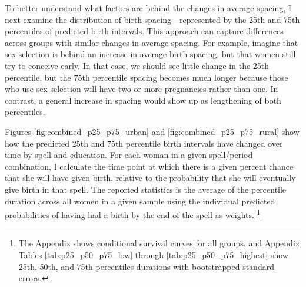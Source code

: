 \documentclass[12pt,letterpaper]{article}
\begin{document}
To better understand what factors are behind the changes in average spacing, I next 
examine the distribution of birth spacing---represented by the 25th and 75th percentiles 
of predicted birth intervals. 
This approach can capture differences across groups with similar changes in average spacing. 
For example, imagine that sex selection is behind an increase in average birth spacing, 
but that women still try to conceive early. 
In that case, we should see little change in the 25th percentile, but the 75th percentile 
spacing becomes much longer because those who use sex selection will have two or more 
pregnancies rather than one. 
In contrast, a general increase in spacing would show up as lengthening of both percentiles.

Figures \ref{fig:combined_p25_p75_urban} and \ref{fig:combined_p25_p75_rural} 
show how the predicted 25th and 75th percentile birth intervals have changed over time 
by spell and education.
For each woman in a given spell/period combination, I calculate the time point at 
which there is a given percent chance that she will have given birth, relative to the
probability that she will eventually give birth in that spell.
The reported statistics is the average of the percentile duration
across all women in a given sample using the individual predicted
probabilities of having had a birth by the end of the spell as weights.%
\footnote{
The Appendix shows conditional survival curves for all groups, and 
Appendix Tables \ref{tab:p25_p50_p75_low} through \ref{tab:p25_p50_p75_highest} 
show 25th, 50th, and 75th percentiles durations with bootstrapped standard errors.
}
\end{document}
